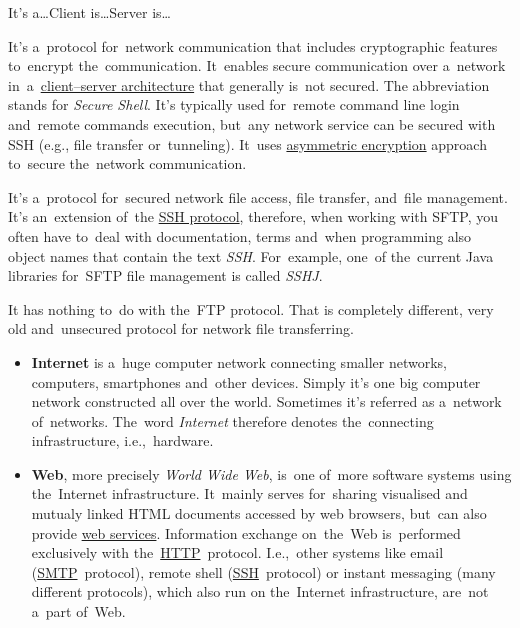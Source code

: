\label{clientserverarchitecture}
\newline\todo It's a\dots Client is\dots Server is\dots


\label{tcp}

\label{ip}

\label{http}

\label{smtp}

\label{ssh}
It's a~protocol for~network communication that includes cryptographic features to~encrypt the~communication. It~enables secure communication over a~network in~a~\hyperref[clientserverarchitecture]{client--server architecture} that generally is~not secured. The abbreviation stands for \textit{Secure Shell}. It's typically used for~remote command line login and~remote commands execution, but~any network service can be secured with SSH (e.g., file transfer or~tunneling). It~uses \hyperref[asymmetricencryption]{asymmetric encryption} approach to~secure the~network communication.

\label{sftp}
It's a~protocol for~secured network file access, file transfer, and~file management. It's an~extension of~the \hyperref[ssh]{SSH protocol}, therefore, when working with SFTP, you often have to~deal with documentation, terms and~when programming also object names that contain the text \textit{SSH}. For~example, one~of the~current Java libraries for~SFTP file management is called \textit{SSHJ}.

\warning It has nothing to~do with the~FTP protocol. That is completely different, very old and~unsecured protocol for network file transferring.

\label{internetweb}
\begin{itemize}
    \item \textbf{Internet} is a~huge computer network connecting smaller networks, computers, smartphones and~other devices. Simply it's one big computer network constructed all over the world. Sometimes it's referred as a~network of~networks. The~word \textit{Internet} therefore denotes the~connecting infrastructure, i.e.,~hardware.
    \item \textbf{Web}, more precisely \textit{World Wide Web}, is~one of~more software systems using the~Internet infrastructure. It~mainly serves for~sharing visualised and mutualy linked HTML documents accessed by web browsers, but~can also provide \hyperref[webservice]{web services}. Information exchange on~the~Web is~performed exclusively with the~\hyperref[http]{HTTP}~protocol. I.e.,~other systems like email (\hyperref[smtp]{SMTP}~protocol), remote shell (\hyperref[ssh]{SSH}~protocol) or instant messaging (many different protocols), which also run on the~Internet infrastructure, are~not a~part of~Web.
\end{itemize}

